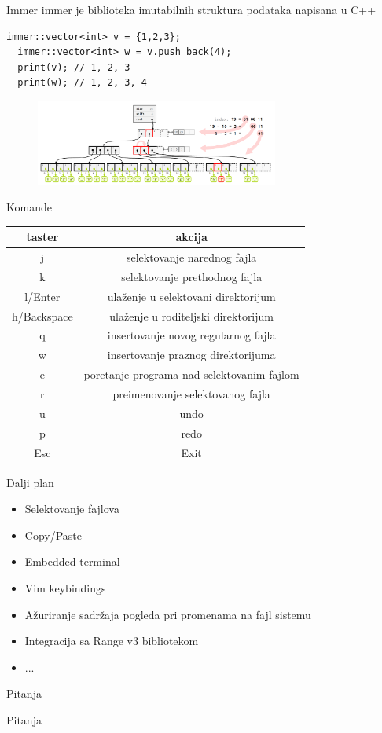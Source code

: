 \documentclass[12pt]{beamer}
\theoremstyle{definition}
\theoremstyle{remark}
\theoremstyle{plain}
\begin{document}
\begin{frame}[fragile]{Immer}
immer je biblioteka imutabilnih struktura podataka napisana u C++
  \begin{lstlisting}[mathescape=true]
  immer::vector<int> v = {1,2,3}; 
  immer::vector<int> w = v.push_back(4); 
  print(v); // 1, 2, 3
  print(w); // 1, 2, 3, 4
  \end{lstlisting}
  \begin{figure}[H]
    \centering
    \includegraphics[width=8cm]{img/rrb.png}
  \end{figure}
\end{frame}

\begin{frame}{Komande}
\begin{tabular}{c | c}
  taster & akcija\\
  \hline
  j & selektovanje narednog fajla \\
  k & selektovanje prethodnog fajla \\
  l/Enter & ula\v zenje u selektovani direktorijum\\
  h/Backspace & ula\v zenje u roditeljski direktorijum\\
  q & insertovanje novog regularnog fajla\\
  w & insertovanje praznog direktorijuma\\
  e & poretanje programa nad selektovanim fajlom\\
  r & preimenovanje selektovanog fajla\\
  u & undo \\
  p & redo \\
  Esc & Exit
\end{tabular}
\end{frame}
\begin{frame}{Dalji plan}
	\begin{itemize}
			 \item{Selektovanje fajlova}
			 \item{Copy/Paste}
			 \item{Embedded terminal}
			 \item{Vim keybindings}
			 \item{A\v zuriranje sadr\v zaja pogleda pri promenama na fajl sistemu}
			 \item{Integracija sa Range v3 bibliotekom}
			 \item{...}
	\end{itemize}
	
\end{frame}

\begin{frame}{Pitanja}
	\begin{center}
		\huge{Pitanja}
	\end{center}
\end{frame}
\end{document}

